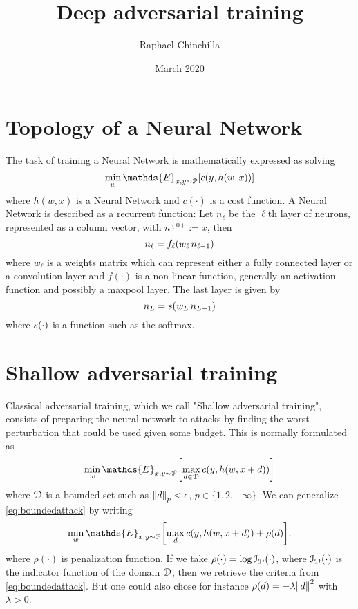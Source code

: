 \documentclass[11pt,letterpaper,DIV=17]{scrartcl}
\title{Deep adversarial training}
\author{Raphael Chinchilla}
\date{March 2020}
\renewcommand{\eE}{\mathds{E}}
\renewcommand{\eE}{\mathds{E}}
\renewcommand{\l}[1][]{_{\ell#1}}
\renewcommand{\L}[1][]{_{L#1}}
\newcommand{\s}{s\qty}
\renewcommand{\c}{c\qty}
\newcommand{\f}{f\l\qty}
\begin{document}
\maketitle

\section{Topology of a Neural Network}

The task of training a Neural Network is mathematically expressed as solving 
\begin{equation} \label{eq:learning}
\min_{w} \eE_{x,y\sim\Pcal}[\c(y,h(w,x))]
\end{equation}
where $h(w,x)$ is a Neural Network and $c(\cdot)$ is a cost function. A Neural Network is described as a recurrent function: Let $n\l$ be the $\ell$th layer of neurons, represented as a column vector, with $n^{(0)}:=x$, then 
\begin{equation} \label{eq:neuron}
n\l=\f(w\l\,n\l[-1])
\end{equation}
where $w\l$ is a weights matrix which can represent either a fully connected layer or a convolution layer and $f(\cdot)$ is a non-linear function, generally an activation function and possibly a maxpool layer. The last layer is given by
\begin{equation} \label{eq:lastlayer}
n\L=\s(w\L\,n\L[-1])
\end{equation}
where $\s(\cdot)$ is a function such as the softmax.

\section{Shallow adversarial training}

Classical adversarial training, which we call "Shallow adversarial training", consists of preparing the neural network to attacks by finding the worst perturbation that could be used given some budget. This is normally formulated as
\begin{equation} \label{eq:boundedattack}
\min_{w} \eE_{x,y\sim\Pcal}\qty[\max_{d\in\Dcal}\c(y,h(w,x+d))]
\end{equation}
where ${\mathcal{D}}$ is a bounded set such as $\norm{d}_p<\epsilon$, $p\in\{1,2,+\infty\}$. We can generalize \eqref{eq:boundedattack} by writing
\begin{equation} \label{eq:shallow}
\min_{w} \eE_{x,y\sim\Pcal}\qty[\max_{d}\c(y,h(w,x+d))+\rho(d)].
\end{equation}
where $\rho(\cdot)$ is penalization function. If we take $\rho(\cdot)=\log{\mathcal{I}}_{{\mathcal{D}}}(\cdot)$, where ${\mathcal{I}}_{{\mathcal{D}}}(\cdot)$ is the indicator function of the domain ${\mathcal{D}}$, then we retrieve the criteria from \eqref{eq:boundedattack}. But one could also chose for instance $\rho(d)=-\lambda\norm{d}^2$ with $\lambda>0$.
\end{document}
